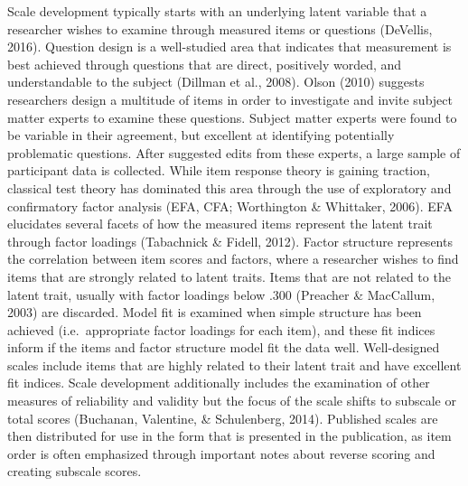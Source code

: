 \documentclass[english,man, mask]{apa6}
\theoremstyle{definition}
\theoremstyle{definition}
\theoremstyle{definition}
\theoremstyle{remark}
\begin{document}
Scale development typically starts with an underlying latent variable
that a researcher wishes to examine through measured items or questions
(DeVellis, 2016). Question design is a well-studied area that indicates
that measurement is best achieved through questions that are direct,
positively worded, and understandable to the subject (Dillman et al.,
2008). Olson (2010) suggests researchers design a multitude of items in
order to investigate and invite subject matter experts to examine these
questions. Subject matter experts were found to be variable in their
agreement, but excellent at identifying potentially problematic
questions. After suggested edits from these experts, a large sample of
participant data is collected. While item response theory is gaining
traction, classical test theory has dominated this area through the use
of exploratory and confirmatory factor analysis (EFA, CFA; Worthington
\& Whittaker, 2006). EFA elucidates several facets of how the measured
items represent the latent trait through factor loadings (Tabachnick \&
Fidell, 2012). Factor structure represents the correlation between item
scores and factors, where a researcher wishes to find items that are
strongly related to latent traits. Items that are not related to the
latent trait, usually with factor loadings below .300 (Preacher \&
MacCallum, 2003) are discarded. Model fit is examined when simple
structure has been achieved (i.e.~appropriate factor loadings for each
item), and these fit indices inform if the items and factor structure
model fit the data well. Well-designed scales include items that are
highly related to their latent trait and have excellent fit indices.
Scale development additionally includes the examination of other
measures of reliability and validity but the focus of the scale shifts
to subscale or total scores (Buchanan, Valentine, \& Schulenberg, 2014).
Published scales are then distributed for use in the form that is
presented in the publication, as item order is often emphasized through
important notes about reverse scoring and creating subscale scores.
\end{document}
